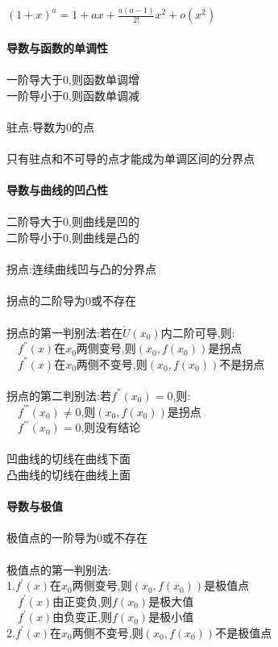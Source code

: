 \documentclass{article}
\begin{document}
\begin{flushleft}
	$(1+x)^a=1+ax+\frac{a(a-1)}{2!}x^2+o(x^2)$\\
	~\\ \textbf{导数与函数的单调性} \\~\\
	一阶导大于0,则函数单调增\\
	一阶导小于0,则函数单调减\\
	~\\
	驻点:导数为0的点\\
	~\\
	只有驻点和不可导的点才能成为单调区间的分界点\\
	~\\ \textbf{导数与曲线的凹凸性} \\~\\
	二阶导大于0,则曲线是凹的\\
	二阶导小于0,则曲线是凸的\\
	~\\
	拐点:连续曲线凹与凸的分界点\\
	~\\
	拐点的二阶导为0或不存在\\
	~\\
	拐点的第一判别法:若在$\mathring{U}(x_0)$内二阶可导,则:\\
	\ \ $f^{''}(x)$在$x_0$两侧变号,则$(x_0,f(x_0))$是拐点\\
	\ \ $f^{''}(x)$在$x_0$两侧不变号,则$(x_0,f(x_0))$不是拐点\\
	~\\
	拐点的第二判别法:若$f^{''}(x_0)=0$,则:\\
	\ \ $f^{'''}(x_0)\neq 0$,则$(x_0,f(x_0))$是拐点\\
	\ \ $f^{'''}(x_0)=0$,则没有结论\\
	~\\
	凹曲线的切线在曲线下面\\
	凸曲线的切线在曲线上面\\
	~\\ \textbf{导数与极值} \\~\\
	极值点的一阶导为0或不存在\\
	~\\
	极值点的第一判别法:\\
	1.$f^{'}(x)$在$x_0$两侧变号,则$(x_0,f(x_0))$是极值点\\
	\ \ $f^{'}(x)$由正变负,则$f(x_0)$是极大值\\
	\ \ $f^{'}(x)$由负变正,则$f(x_0)$是极小值\\
	2.$f^{'}(x)$在$x_0$两侧不变号,则$(x_0,f(x_0))$不是极值点\\

\end{flushleft}
\end{document}
